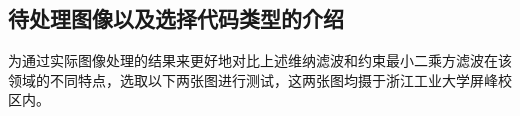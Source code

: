 \documentclass[UTF8]{ctexart}
\begin{document}
    \subsection{待处理图像以及选择代码类型的介绍}
    为通过实际图像处理的结果来更好地对比上述维纳滤波和约束最小二乘方滤波在该领域的不同特点，选取以下两张图进行测试，这两张图均摄于浙江工业大学屏峰校区内。
    \begin{figure}[htbp]
        \begin{center}
\end{center}
\end{figure}
\end{document}
